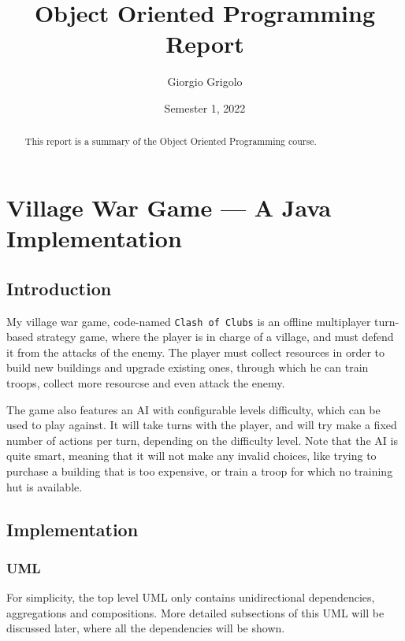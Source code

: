 \documentclass{article}
\title{Object Oriented Programming Report}
\author{Giorgio Grigolo}
\date{Semester 1, 2022}
\newcommand{\code}[1]{\texttt{#1}}
\begin{document}
\maketitle
\begin{abstract}
	This report is a summary of the Object Oriented Programming course.
\end{abstract}

\tableofcontents

\newpage

\section{Village War Game --- A Java Implementation}

\subsection{Introduction}

My village war game, code-named \code{Clash of Clubs} is an offline multiplayer turn-based strategy game,
where the player is in charge of a village, and must defend it from the attacks of 
the enemy. The player must collect resources in order to build new buildings and upgrade existing ones, through which he can train troops,
collect more resourcse and even attack the enemy.

The game also features an AI with configurable levels difficulty, which can be used to play against.
It will take turns with the player, and will try make a fixed number of actions per turn, 
depending on the difficulty level. Note that the AI is quite smart, meaning that it will not make any invalid choices,
like trying to purchase a building that is too expensive, or train a troop for which no training hut is available.

\subsection{Implementation}

\subsubsection{UML}

For simplicity, the top level UML only contains unidirectional dependencies, aggregations and compositions.
More detailed subsections of this UML will be discussed later, where all the dependencies will be shown.
\end{document}
